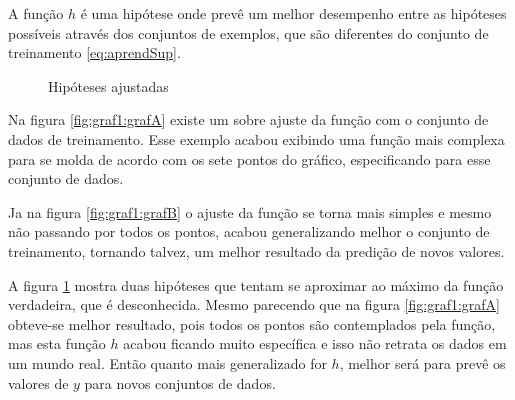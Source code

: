 A função ${h}$ é uma hipótese onde prevê um melhor desempenho entre as hipóteses possíveis através dos conjuntos de exemplos, que são diferentes do conjunto de treinamento \ref{eq:aprendSup}.

 \begin{figure}[h!]
    \centering
    \quad
    
    \caption{Hipóteses ajustadas} \label{fig:graf1}
        
\end{figure}

Na figura \ref{fig:graf1:grafA} existe um sobre ajuste da função com o conjunto de dados de treinamento. Esse exemplo acabou exibindo uma função mais complexa para se molda de acordo com os sete pontos do gráfico, especificando para esse conjunto de dados. 

Ja na figura \ref{fig:graf1:grafB} o ajuste da função se torna mais simples e mesmo não passando por todos os pontos, acabou generalizando melhor o conjunto de treinamento, tornando talvez, um melhor resultado da predição de novos valores. 

A figura \ref{fig:graf1} mostra duas hipóteses que tentam se aproximar ao máximo da função verdadeira, que é desconhecida. Mesmo parecendo que  na figura \ref{fig:graf1:grafA} obteve-se melhor resultado, pois todos os pontos são contemplados pela função, mas esta função ${h}$ acabou ficando muito específica e isso não retrata os dados em um mundo real. Então quanto mais  generalizado for ${h}$, melhor será para prevê os valores de ${y}$ para novos conjuntos de dados.

